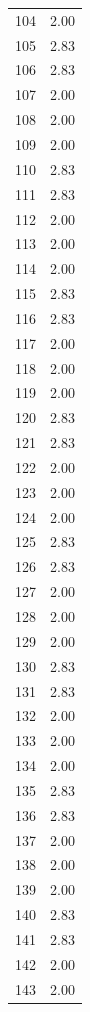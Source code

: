 \documentclass[a4paper,11pt]{article}
\begin{document}
\begin{center}
\begin{longtable}{|R{1.5cm}|R{2.5cm}|}
  104  &         2.00 \\ 
  105  &         2.83 \\ 
  106  &         2.83 \\ 
  107  &         2.00 \\ 
  108  &         2.00 \\ 
  109  &         2.00 \\ 
  110  &         2.83 \\ 
  111  &         2.83 \\ 
  112  &         2.00 \\ 
  113  &         2.00 \\ 
  114  &         2.00 \\ 
  115  &         2.83 \\ 
  116  &         2.83 \\ 
  117  &         2.00 \\ 
  118  &         2.00 \\ 
  119  &         2.00 \\ 
  120  &         2.83 \\ 
  121  &         2.83 \\ 
  122  &         2.00 \\ 
  123  &         2.00 \\ 
  124  &         2.00 \\ 
  125  &         2.83 \\ 
  126  &         2.83 \\ 
  127  &         2.00 \\ 
  128  &         2.00 \\ 
  129  &         2.00 \\ 
  130  &         2.83 \\ 
  131  &         2.83 \\ 
  132  &         2.00 \\ 
  133  &         2.00 \\ 
  134  &         2.00 \\ 
  135  &         2.83 \\ 
  136  &         2.83 \\ 
  137  &         2.00 \\ 
  138  &         2.00 \\ 
  139  &         2.00 \\ 
  140  &         2.83 \\ 
  141  &         2.83 \\ 
  142  &         2.00 \\ 
  143  &         2.00 \\ 

\end{longtable}
\end{center}
\end{document}
